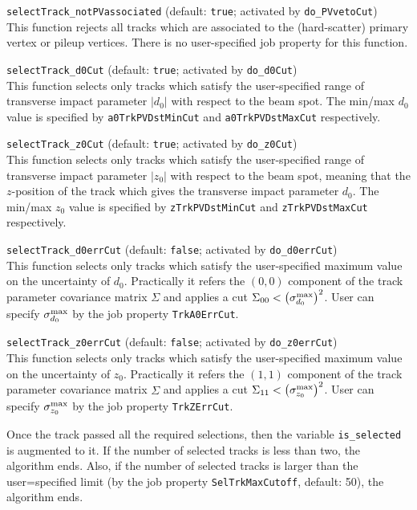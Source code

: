 \documentclass[NOTE, atlasdraft=true, texlive=2018, UKenglish]{\ATLASLATEXPATH atlasdoc}
\begin{document}
\begin{description}
\item{{\tt selectTrack\_notPVassociated} (default: {\tt true}; activated by {\tt do\_PVvetoCut}})\\This function rejects all tracks which are associated to the (hard-scatter) primary vertex or pileup vertices. There is no user-specified job property for this function.
\item{{\tt selectTrack\_d0Cut} (default: {\tt true}; activated by {\tt do\_d0Cut})}\\This function selects only tracks which satisfy the user-specified range of transverse impact parameter $|d_{0}|$ with respect to the beam spot. The min/max $d_{0}$ value is specified by {\tt a0TrkPVDstMinCut} and {\tt a0TrkPVDstMaxCut} respectively.
\item{{\tt selectTrack\_z0Cut} (default: {\tt true}; activated by {\tt do\_z0Cut})}\\This function selects only tracks which satisfy the user-specified range of transverse impact parameter $|z_{0}|$ with respect to the beam spot, meaning that the $z$-position of the track which gives the transverse impact parameter $d_{0}$. The min/max $z_{0}$ value is specified by {\tt zTrkPVDstMinCut} and {\tt zTrkPVDstMaxCut} respectively.
\item{{\tt selectTrack\_d0errCut} (default: {\tt false}; activated by {\tt do\_d0errCut}})\\This function selects only tracks which satisfy the user-specified maximum value on the uncertainty of $d_{0}$. Practically it refers the $(0,0)$ component of the track parameter covariance matrix $\Sigma$ and applies a cut $\Sigma_{00} < \left(\sigma_{d_{0}}^{\rm max}\right)^{2}$. User can specify $\sigma_{d_{0}}^{\rm max}$ by the job property {\tt TrkA0ErrCut}.
\item{{\tt selectTrack\_z0errCut} (default: {\tt false}; activated by {\tt do\_z0errCut}})\\This function selects only tracks which satisfy the user-specified maximum value on the uncertainty of $z_{0}$. Practically it refers the $(1,1)$ component of the track parameter covariance matrix $\Sigma$ and applies a cut $\Sigma_{11} < \left(\sigma_{z_{0}}^{\rm max}\right)^{2}$. User can specify $\sigma_{z_{0}}^{\rm max}$ by the job property {\tt TrkZErrCut}.
\end{description}

Once the track passed all the required selections, then the variable {\tt is\_selected} is augmented to it. If the number of selected tracks is less than two, the algorithm ends. Also, if the number of selected tracks is larger than the user=specified limit (by the job property {\tt SelTrkMaxCutoff}, default: 50), the algorithm ends.
\end{document}
